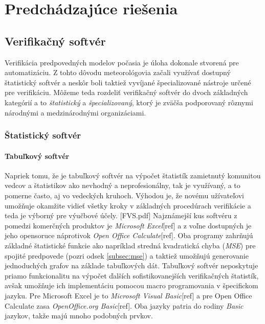 \chapter{Predchádzajúce riešenia}

\section{Verifikačný softvér}

Verifikácia predpovedných modelov počasia je úloha dokonale stvorená pre automatizáciu. 
Z tohto dôvodu meteorológovia začali využívať dostupný štatistický softvér 
a neskôr boli taktiež vyvíjané špecializované nástroje určené pre verifikáciu.
Môžeme teda rozdeliť verifikačný softvér do dvoch základných kategórií a to \textit{štatistický} a \textit{špecializovaný}, ktorý je zväčša podporovaný rôznymi národnými a medzinárodnými organizáciami.

\subsection{Štatistický softvér}

\subsubsection{Tabuľkový softvér}
Napriek tomu, že je tabuľkový softvér na výpočet štatistík zamietnutý komunitou vedcov a štatistikov ako nevhodný a neprofesionálny, tak je využívaný, a to pomerne často, aj vo vedeckých kruhoch. 
Výhodou je, že novému užívateľovi umožňuje okamžite vidieť všetky kroky v základných procedúrach verifikácie a teda je výborný pre výučbové účely. [FVS.pdf]
Najznámejší kus softvéru z pomedzi komerčných produktov je \textit{Microsoft Excel}[ref] a z voľne dostupných je jeho opensoruce náprotivok \textit{Open Office Calculate}[ref]. Oba programy zahrňujú základné štatistické funkcie ako napríklad stredná kvadratická chyba (\textit{MSE}) pre spojité predpovede (pozri odsek \ref{subsec:mse}) a taktiež umožňujú generovanie jednoduchých grafov na základe tabuľkových dát. Tabuľkový softvér neposkytuje priamo funkcionalitu na výpočet ďalších sofistikovanejších verifikačných štatistík, avšak umožňuje ich implementáciu pomocou macro programovania v špecifickom jazyku. Pre Microsoft Excel je to \textit{Microsoft Visual Basic}[ref] a pre Open Office Calculate zasa \textit{OpenOffice.org Basic}[ref]. Oba jazyky patria do rodiny \textit{Basic} jazykov, takže majú mnoho podobných prvkov.  


